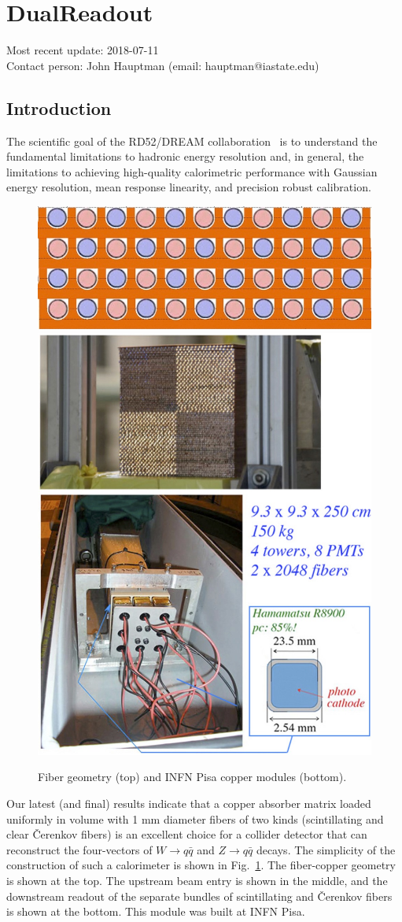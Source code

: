 \section{DualReadout}
Most recent update: 2018-07-11 \\
Contact person: John Hauptman (email:  hauptman@iastate.edu)

\subsection{Introduction}
The scientific goal of the RD52/DREAM collaboration~\cite{dreamCollaboration} is to understand the fundamental limitations
to hadronic energy resolution and, in general, the limitations to achieving high-quality calorimetric
performance with Gaussian energy resolution, mean response linearity, and precision robust calibration.

\begin{figure}
  \centering
  \includegraphics[width=.5\linewidth]{Calorimeter/DualReadout/f32-fibers.jpg} \\
  \includegraphics[width=.5\linewidth]{Calorimeter/DualReadout/f33-pisa-module.jpg}
  \caption{Fiber geometry (top) and INFN Pisa copper modules (bottom).}
  \label{fig:pisa}
\end{figure}

Our latest (and final) results indicate that a copper absorber matrix loaded uniformly in volume with 1 mm diameter
fibers of two kinds (scintillating and clear \v{C}er\-enk\-ov fibers) is an excellent choice for a collider detector that 
can reconstruct the four-vectors of $W \rightarrow q\bar{q}$ and  $Z \rightarrow q\bar{q}$ decays.  The simplicity of the construction of such a calorimeter is shown in Fig.~\ref{fig:pisa}.  The fiber-copper geometry is shown at the top.  The upstream beam entry is shown in the middle, and the downstream readout of the separate bundles of  scintillating and \v{C}er\-enk\-ov fibers is shown at the bottom.  This module was built at INFN Pisa.

